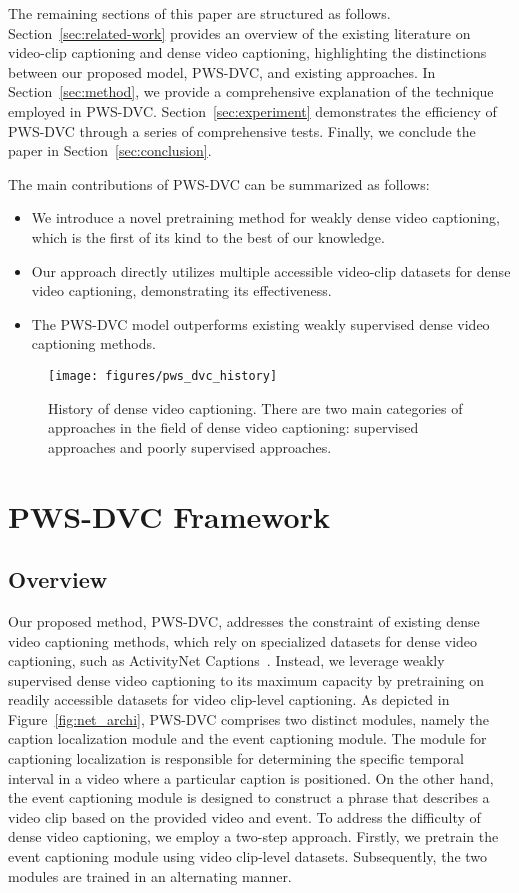 The remaining sections of this paper are structured as follows.
Section~\ref{sec:related-work} provides an overview of the existing literature on video-clip captioning and dense video captioning, highlighting the distinctions between our proposed model, PWS-DVC, and existing approaches.
In Section~\ref{sec:method}, we provide a comprehensive explanation of the technique employed in PWS-DVC.
Section~\ref{sec:experiment} demonstrates the efficiency of PWS-DVC through a series of comprehensive tests.
Finally, we conclude the paper in Section~\ref{sec:conclusion}.

The main contributions of PWS-DVC can be summarized as follows:
\begin{itemize}
    \item We introduce a novel pretraining method for weakly dense video captioning, which is the first of its kind to the best of our knowledge.
    \item Our approach directly utilizes multiple accessible video-clip datasets for dense video captioning, demonstrating its effectiveness.
    \item The PWS-DVC model outperforms existing weakly supervised dense video captioning methods.
\end{itemize}

\begin{figure}[t]
    \centering
    \texttt{[image: figures/pws\_dvc\_history]}
    \caption{History of dense video captioning.
        There are two main categories of approaches in the field of dense video captioning: supervised approaches and poorly supervised approaches.}
    \label{fig:history}
\end{figure}



\section{PWS-DVC Framework}

\subsection{Overview}
Our proposed method, PWS-DVC, addresses the constraint of existing dense video captioning methods, which rely on specialized datasets for dense video captioning, such as ActivityNet Captions~\cite{Krishna2017-pw}.
Instead, we leverage weakly supervised dense video captioning to its maximum capacity by pretraining on readily accessible datasets for video clip-level captioning.
As depicted in Figure~\ref{fig:net_archi}, PWS-DVC comprises two distinct modules, namely the caption localization module and the event captioning module.
The module for captioning localization is responsible for determining the specific temporal interval in a video where a particular caption is positioned. On the other hand, the event captioning module is designed to construct a phrase that describes a video clip based on the provided video and event.
To address the difficulty of dense video captioning, we employ a two-step approach. Firstly, we pretrain the event captioning module using video clip-level datasets.
Subsequently, the two modules are trained in an alternating manner.

